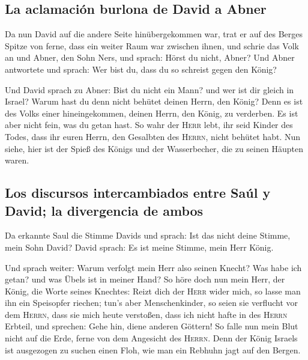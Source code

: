 \hypertarget{la-aclamaciuxf3n-burlona-de-david-a-abner}{%
\subsection{La aclamación burlona de David a
Abner}\label{la-aclamaciuxf3n-burlona-de-david-a-abner}}

 Da nun David auf die andere Seite hinübergekommen war,
trat er auf des Berges Spitze von ferne, dass ein weiter Raum war
zwischen ihnen,  und schrie das Volk an und Abner, den
Sohn Ners, und sprach: Hörst du nicht, Abner? Und Abner antwortete und
sprach: Wer bist du, dass du so schreist gegen den König?

 Und David sprach zu Abner: Bist du nicht ein Mann? und
wer ist dir gleich in Israel? Warum hast du denn nicht behütet deinen
Herrn, den König? Denn es ist des Volks einer hineingekommen, deinen
Herrn, den König, zu verderben.  Es ist aber nicht fein,
was du getan hast. So wahr der \textsc{Herr} lebt, ihr seid Kinder des
Todes, dass ihr euren Herrn, den Gesalbten des \textsc{Herrn}, nicht
behütet habt. Nun siehe, hier ist der Spieß des Königs und der
Wasserbecher, die zu seinen Häupten waren.

\hypertarget{los-discursos-intercambiados-entre-sauxfal-y-david-la-divergencia-de-ambos}{%
\subsection{Los discursos intercambiados entre Saúl y David; la
divergencia de
ambos}\label{los-discursos-intercambiados-entre-sauxfal-y-david-la-divergencia-de-ambos}}

 Da erkannte Saul die Stimme Davids und sprach: Ist das
nicht deine Stimme, mein Sohn David? David sprach: Es ist meine Stimme,
mein Herr König.

 Und sprach weiter: Warum verfolgt mein Herr also seinen
Knecht? Was habe ich getan? und was Übels ist in meiner Hand?
 So höre doch nun mein Herr, der König, die Worte seines
Knechtes: Reizt dich der \textsc{Herr} wider mich, so lasse man ihn ein
Speisopfer riechen; tun's aber Menschenkinder, so seien sie verflucht
vor dem \textsc{Herrn}, dass sie mich heute verstoßen, dass ich nicht
hafte in des \textsc{Herrn} Erbteil, und sprechen: Gehe hin, diene
anderen Göttern!  So falle nun mein Blut nicht auf die
Erde, ferne von dem Angesicht des \textsc{Herrn}. Denn der König Israels
ist ausgezogen zu suchen einen Floh, wie man ein Rebhuhn jagt auf den
Bergen.

